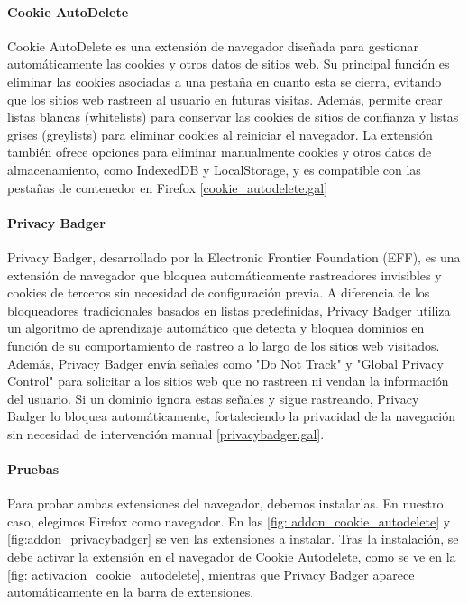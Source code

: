 \paragraph{Cookie AutoDelete}

Cookie AutoDelete es una extensión de navegador diseñada para gestionar automáticamente las cookies y otros datos de sitios web. Su principal función es eliminar las cookies asociadas a una pestaña en cuanto esta se cierra, evitando que los sitios web rastreen al usuario en futuras visitas. Además, permite crear listas blancas (whitelists) para conservar las cookies de sitios de confianza y listas grises (greylists) para eliminar cookies al reiniciar el navegador. La extensión también ofrece opciones para eliminar manualmente cookies y otros datos de almacenamiento, como IndexedDB y LocalStorage, y es compatible con las pestañas de contenedor en Firefox [\url{cookie_autodelete.gal}]

\paragraph{Privacy Badger}

Privacy Badger, desarrollado por la Electronic Frontier Foundation (EFF), es una extensión de navegador que bloquea automáticamente rastreadores invisibles y cookies de terceros sin necesidad de configuración previa. A diferencia de los bloqueadores tradicionales basados en listas predefinidas, Privacy Badger utiliza un algoritmo de aprendizaje automático que detecta y bloquea dominios en función de su comportamiento de rastreo a lo largo de los sitios web visitados. Además, Privacy Badger envía señales como "Do Not Track" y "Global Privacy Control" para solicitar a los sitios web que no rastreen ni vendan la información del usuario. Si un dominio ignora estas señales y sigue rastreando, Privacy Badger lo bloquea automáticamente, fortaleciendo la privacidad de la navegación sin necesidad de intervención manual [\url{privacybadger.gal}]. 

\paragraph{Pruebas}

Para probar ambas extensiones del navegador, debemos instalarlas. En nuestro caso, elegimos Firefox como navegador. En las \ref{fig: addon_cookie_autodelete} y \ref{fig:addon_privacybadger} se ven las extensiones a instalar. Tras la instalación, se debe activar la extensión en el navegador de Cookie Autodelete, como se ve en la \ref{fig: activacion_cookie_autodelete}, mientras que Privacy Badger aparece automáticamente en la barra de extensiones. 

